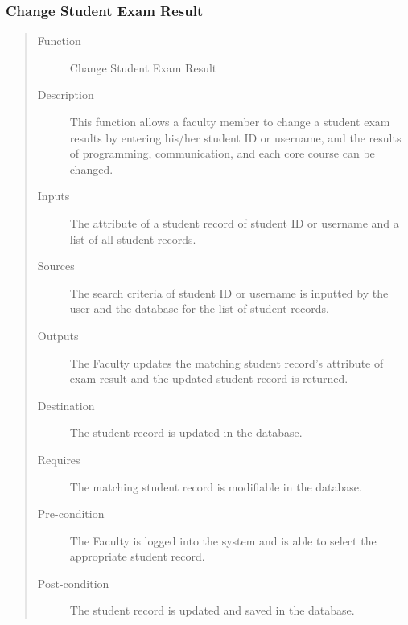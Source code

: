 \subsubsection{Change Student Exam Result }
\begin{quote} %
\begin{description}
\item[Function]
   Change Student Exam Result
\item[Description]
   This function allows a faculty member to change a student exam results by
   entering his/her student ID or username, and the results of programming,
   communication, and each core course can be changed.
\item[Inputs]
   The attribute of a student record of student ID or username and a list of all
   student records.
\item[Sources]
   The search criteria of student ID or username is inputted by the user and the
   database for the list of student records.
\item[Outputs]
   The Faculty updates the matching student record's attribute of exam result
   and the updated student record is returned.
\item[Destination]
   The student record is updated in the database.
\item[Requires]
   The matching student record is modifiable in the database.
\item[Pre-condition]
   The Faculty is logged into the system and is able to select the appropriate
   student record.
\item[Post-condition]
   The student record is updated and saved in the database.
\end{description}
\end{quote} %

